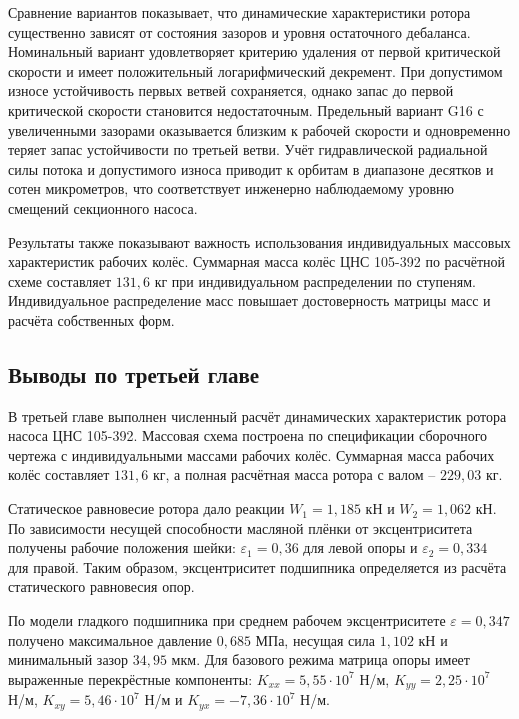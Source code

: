 Сравнение вариантов показывает, что динамические характеристики ротора существенно зависят от состояния зазоров и уровня остаточного дебаланса. Номинальный вариант удовлетворяет критерию удаления от первой критической скорости и имеет положительный логарифмический декремент. При допустимом износе устойчивость первых ветвей сохраняется, однако запас до первой критической скорости становится недостаточным. Предельный вариант G16 с увеличенными зазорами оказывается близким к рабочей скорости и одновременно теряет запас устойчивости по третьей ветви. Учёт гидравлической радиальной силы потока и допустимого износа приводит к орбитам в диапазоне десятков и сотен микрометров, что соответствует инженерно наблюдаемому уровню смещений секционного насоса.

Результаты также показывают важность использования индивидуальных массовых характеристик рабочих колёс. Суммарная масса колёс ЦНС 105-392 по расчётной схеме составляет $131{,}6$ кг при индивидуальном распределении по ступеням. Индивидуальное распределение масс повышает достоверность матрицы масс и расчёта собственных форм.



\subsection{Выводы по третьей главе}

В третьей главе выполнен численный расчёт динамических характеристик ротора насоса ЦНС 105-392. Массовая схема построена по спецификации сборочного чертежа с индивидуальными массами рабочих колёс. Суммарная масса рабочих колёс составляет $131{,}6$ кг, а полная расчётная масса ротора с валом -- $229{,}03$ кг.

Статическое равновесие ротора дало реакции $W_1=1{,}185$ кН и $W_2=1{,}062$ кН. По зависимости несущей способности масляной плёнки от эксцентриситета получены рабочие положения шейки: $\varepsilon_1=0{,}36$ для левой опоры и $\varepsilon_2=0{,}334$ для правой. Таким образом, эксцентриситет подшипника определяется из расчёта статического равновесия опор.

По модели гладкого подшипника при среднем рабочем эксцентриситете $\varepsilon=0{,}347$ получено максимальное давление $0{,}685$ МПа, несущая сила $1{,}102$ кН и минимальный зазор $34{,}95$ мкм. Для базового режима матрица опоры имеет выраженные перекрёстные компоненты: $K_{xx}=5{,}55\cdot10^7$ Н/м, $K_{yy}=2{,}25\cdot10^7$ Н/м, $K_{xy}=5{,}46\cdot10^7$ Н/м и $K_{yx}=-7{,}36\cdot10^7$ Н/м.

